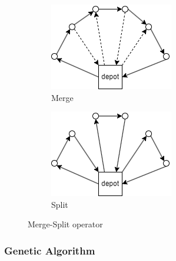 \documentclass[conference]{IEEEtran}
\begin{document}
\begin{figure}[h]
    \begin{subfigure}[t]{0.24\textwidth}
        \centering
        \includegraphics[width=\textwidth]{splitting_1.png}
        \caption{Merge}
    \end{subfigure}
    \begin{subfigure}[t]{0.24\textwidth}
        \centering
        \includegraphics[width=\textwidth]{splitting_2.png}
        \caption{Split}
    \end{subfigure}
    \caption{Merge-Split operator}
\end{figure}

\subsubsection{Genetic Algorithm}
\end{document}

